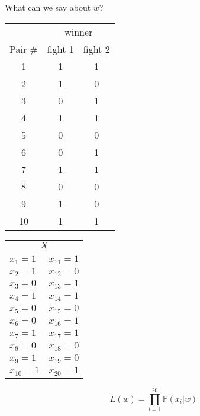\documentclass[landscape]{foils}
\renewcommand{\Pr}{\mathbb{P}}
\begin{document}
What can we say about $w$?


\myNewSlide
\begin{center}
\begin{tabular}{|c|c|c|}
\hline
& \multicolumn{2}{c|}{winner}\\
Pair \# & fight 1 & fight 2 \\
\hline
1 & 1 & 1  \\
\hline
2 & 1 & 0  \\
\hline
3 & 0 & 1  \\
\hline
4 & 1 & 1  \\
\hline
5 & 0 & 0  \\
\hline
6 & 0 & 1   \\
\hline
7 & 1 & 1  \\
\hline
8 & 0 & 0  \\
\hline
9 & 1 & 0  \\
\hline
10 & 1 & 1   \\
\hline
\end{tabular}
\begin{tabular}{ll}
\multicolumn{2}{c}{$X$}\\
\\
$x_1 = 1$ & $x_{11} = 1$  \\
$x_2 = 1$ & $x_{12} = 0$  \\
$x_3 = 0$ & $x_{13} = 1$  \\
$x_4 = 1$ & $x_{14} = 1$  \\
$x_5 = 0$ & $x_{15} = 0$  \\
$x_6 = 0$ & $x_{16} = 1$  \\
$x_7 = 1$ & $x_{17} = 1$  \\
$x_8 = 0$ & $x_{18} = 0$  \\
$x_9 = 1$ & $x_{19} = 0$  \\
$x_{10} = 1$ & $x_{20} = 1$  \\
\end{tabular}
\end{center}

$$L(w) = \prod_{i=1}^{20} \Pr(x_i|w)$$
\end{document}

